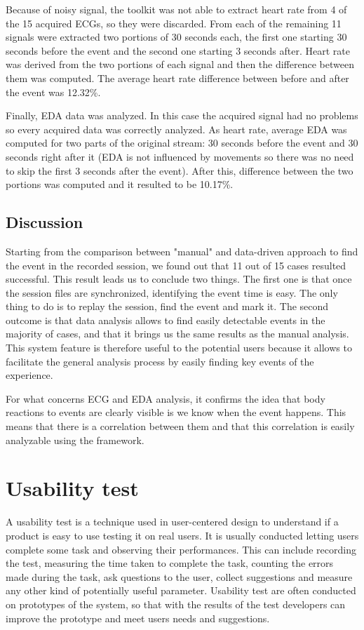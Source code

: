 \documentclass[binding=0.6cm,LaM]{sapthesis}
\begin{document}
Because of noisy signal, the toolkit was not able to extract heart rate from 4 of the 15 acquired ECGs, so they were discarded. From each of the remaining 11 signals were extracted two portions of 30 seconds each, the first one starting 30 seconds before the event and the second one starting 3 seconds after. Heart rate was derived from the two portions of each signal and then the difference between them was computed. The average heart rate difference between before and after the event was 12.32\%. 

Finally, EDA data was analyzed. In this case the acquired signal had no problems so every acquired data was correctly analyzed. As heart rate, average EDA was computed for two parts of the original stream: 30 seconds before the event and 30 seconds right after it (EDA is not influenced by movements so there was no need to skip the first 3 seconds after the event). After this, difference between the two portions was computed and it resulted to be 10.17\%. 

\subsection{Discussion}
Starting from the comparison between "manual" and data-driven approach to find the event in the recorded session, we found out that 11 out of 15 cases resulted successful. This result leads us to conclude two things. The first one is that once the session files are synchronized, identifying the event time is easy. The only thing to do is to replay the session, find the event and mark it. The second outcome is that data analysis allows to find easily detectable events in the majority of cases, and that it brings us the same results as the manual analysis. This system feature is therefore useful to the potential users because it allows to facilitate the general analysis process by easily finding key events of the experience.

For what concerns ECG and EDA analysis, it confirms the idea that body reactions to events are clearly visible is we know when the event happens. This means that there is a correlation between them and that this correlation is easily analyzable using the framework.

\section{Usability test}
A usability test is a technique used in user-centered design to understand if a product is easy to use testing it on real users. It is usually conducted letting users complete some task and observing their performances. 
This can include recording the test, measuring the time taken to complete the task, counting the errors made during the task, ask questions to the user, collect suggestions and measure any other kind of potentially useful parameter. Usability test are often conducted on prototypes of the system, so that with the results of the test developers can improve the prototype and meet users needs and suggestions. 
\end{document}
